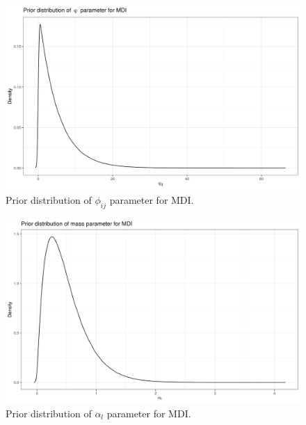 \documentclass[14pt]{extarticle} %
\begin{document}
	\begin{figure}[!htb]
		\centering
		\includegraphics[scale=0.65]{Images/Data_inspection/phi_prior.png}
		\caption{Prior distribution of $\phi_{ij}$ parameter for MDI.}
		\label{fig:mdi_phi_prior}
	\end{figure}

	\begin{figure}[!htb]
		\centering
		\includegraphics[scale=0.65]{Images/Data_inspection/alpha_prior.png}
		\caption{Prior distribution of $\alpha_l$ parameter for MDI.}
		\label{fig:mdi_alpha_prior}
	\end{figure}
\end{document}
